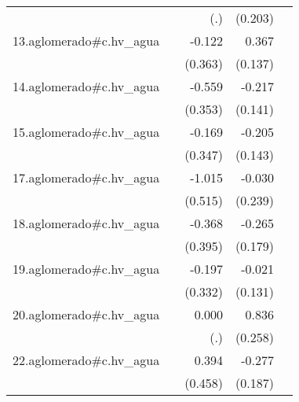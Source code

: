 {\begin{longtable}{l*{4}{D{.}{.}{-1}}}
            &                     &         (.)         &     (0.203)         &                     \\
\addlinespace
13.aglomerado#c.hv\_agua&                     &      -0.122         &       0.367\sym{**} &                     \\
            &                     &     (0.363)         &     (0.137)         &                     \\
\addlinespace
14.aglomerado#c.hv\_agua&                     &      -0.559         &      -0.217         &                     \\
            &                     &     (0.353)         &     (0.141)         &                     \\
\addlinespace
15.aglomerado#c.hv\_agua&                     &      -0.169         &      -0.205         &                     \\
            &                     &     (0.347)         &     (0.143)         &                     \\
\addlinespace
17.aglomerado#c.hv\_agua&                     &      -1.015\sym{*}  &      -0.030         &                     \\
            &                     &     (0.515)         &     (0.239)         &                     \\
\addlinespace
18.aglomerado#c.hv\_agua&                     &      -0.368         &      -0.265         &                     \\
            &                     &     (0.395)         &     (0.179)         &                     \\
\addlinespace
19.aglomerado#c.hv\_agua&                     &      -0.197         &      -0.021         &                     \\
            &                     &     (0.332)         &     (0.131)         &                     \\
\addlinespace
20.aglomerado#c.hv\_agua&                     &       0.000         &       0.836\sym{**} &                     \\
            &                     &         (.)         &     (0.258)         &                     \\
\addlinespace
22.aglomerado#c.hv\_agua&                     &       0.394         &      -0.277         &                     \\
            &                     &     (0.458)         &     (0.187)         &                     \\

\end{longtable}}
